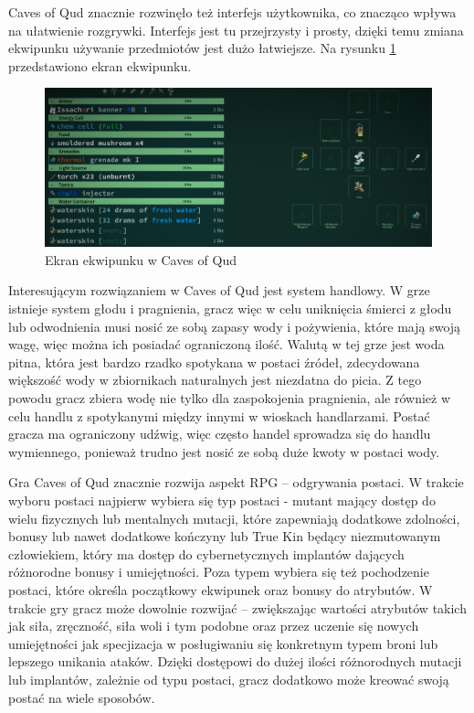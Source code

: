 \documentclass[12pt,twoside]{article}
\begin{document}
Caves of Qud znacznie rozwinęło też interfejs użytkownika, co znacząco wpływa na ułatwienie rozgrywki. Interfejs jest tu przejrzysty i prosty, dzięki temu zmiana ekwipunku używanie przedmiotów jest dużo łatwiejsze. Na rysunku \ref{CoQ:scr2} przedstawiono ekran ekwipunku.

\FloatBarrier
\begin{figure}[h]
	\centering
	\includegraphics[width=14cm]{images/caves_of_qud/scr2.png}
	\caption{Ekran ekwipunku w Caves of Qud}
	\label{CoQ:scr2}
\end{figure}
\FloatBarrier

Interesującym rozwiązaniem w Caves of Qud jest system handlowy. W grze istnieje system głodu i pragnienia, gracz więc w celu uniknięcia śmierci z głodu lub odwodnienia musi nosić ze sobą zapasy wody i pożywienia, które mają swoją wagę, więc można ich posiadać ograniczoną ilość. Walutą w tej grze jest woda pitna, która jest bardzo rzadko spotykana w postaci źródeł, zdecydowana większość wody w zbiornikach naturalnych jest niezdatna do picia. Z tego powodu gracz zbiera wodę nie tylko dla zaspokojenia pragnienia, ale również w celu handlu z spotykanymi między innymi w wioskach handlarzami. Postać gracza ma ograniczony udźwig, więc często handel sprowadza się do handlu wymiennego, ponieważ trudno jest nosić ze sobą duże kwoty w postaci wody.

Gra Caves of Qud znacznie rozwija aspekt RPG -- odgrywania postaci. W trakcie wyboru postaci najpierw wybiera się typ postaci - mutant mający dostęp do wielu fizycznych lub mentalnych mutacji, które zapewniają dodatkowe zdolności, bonusy lub nawet dodatkowe kończyny lub True Kin będący niezmutowanym człowiekiem, który ma dostęp do cybernetycznych implantów dających różnorodne bonusy i umiejętności. Poza typem wybiera się też pochodzenie postaci, które określa początkowy ekwipunek oraz bonusy do atrybutów. W trakcie gry gracz może dowolnie rozwijać -- zwiększając wartości atrybutów takich jak siła, zręczność, siła woli i tym podobne oraz przez uczenie się nowych umiejętności jak specjizacja w posługiwaniu się konkretnym typem broni lub lepszego unikania ataków. Dzięki dostępowi do dużej ilości różnorodnych mutacji lub implantów, zależnie od typu postaci, gracz dodatkowo może kreować swoją postać na wiele sposobów.
\end{document}

